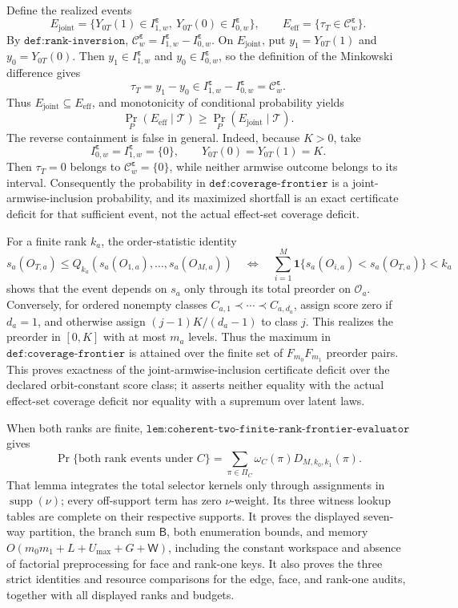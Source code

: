 Define the realized events
\[
E_{\mathrm{joint}}
=
\{Y_{0T}(1)\in I^{\boldsymbol\varepsilon}_{1,w},\
Y_{0T}(0)\in I^{\boldsymbol\varepsilon}_{0,w}\},
\qquad
E_{\mathrm{eff}}
=
\{\tau_T\in\mathcal C^{\boldsymbol\varepsilon}_w\}.
\]
By \(\texttt{def:rank-inversion}\),
\(\mathcal C^{\boldsymbol\varepsilon}_w
=I^{\boldsymbol\varepsilon}_{1,w}
-I^{\boldsymbol\varepsilon}_{0,w}\).
On \(E_{\mathrm{joint}}\), put \(y_1=Y_{0T}(1)\) and \(y_0=Y_{0T}(0)\). Then
\(y_1\in I^{\boldsymbol\varepsilon}_{1,w}\) and
\(y_0\in I^{\boldsymbol\varepsilon}_{0,w}\), so the definition of the Minkowski difference gives
\[
\tau_T=y_1-y_0
\in I^{\boldsymbol\varepsilon}_{1,w}
-I^{\boldsymbol\varepsilon}_{0,w}
=\mathcal C^{\boldsymbol\varepsilon}_w.
\tag{A}
\]
Thus \(E_{\mathrm{joint}}\subseteq E_{\mathrm{eff}}\), and monotonicity of conditional probability yields
\[
\Pr_P(E_{\mathrm{eff}}\mid\mathcal T)
\ge
\Pr_P(E_{\mathrm{joint}}\mid\mathcal T).
\tag{B}
\]
The reverse containment is false in general. Indeed, because \(K>0\), take
\[
I^{\boldsymbol\varepsilon}_{0,w}
=I^{\boldsymbol\varepsilon}_{1,w}=\{0\},
\qquad
Y_{0T}(0)=Y_{0T}(1)=K.
\]
Then \(\tau_T=0\) belongs to
\(\mathcal C^{\boldsymbol\varepsilon}_w=\{0\}\), while neither armwise outcome belongs to its interval. Consequently the probability in \(\texttt{def:coverage-frontier}\) is a joint-armwise-inclusion probability, and its maximized shortfall is an exact certificate deficit for that sufficient event, not the actual effect-set coverage deficit.

For a finite rank \(k_a\), the order-statistic identity
\[
s_a(O_{T,a})\le Q_{k_a}(s_a(O_{1,a}),\ldots,s_a(O_{M,a}))
\quad\Longleftrightarrow\quad
\sum_{i=1}^M\mathbf 1\{s_a(O_{i,a})<s_a(O_{T,a})\}<k_a
\tag{1}
\]
shows that the event depends on \(s_a\) only through its total preorder on \(\mathcal O_a\). Conversely, for ordered nonempty classes \(C_{a,1}\prec\cdots\prec C_{a,d_a}\), assign score zero if \(d_a=1\), and otherwise assign \((j-1)K/(d_a-1)\) to class \(j\). This realizes the preorder in \([0,K]\) with at most \(m_a\) levels. Thus the maximum in \(\texttt{def:coverage-frontier}\) is attained over the finite set of \(F_{m_0}F_{m_1}\) preorder pairs. This proves exactness of the joint-armwise-inclusion certificate deficit over the declared orbit-constant score class; it asserts neither equality with the actual effect-set coverage deficit nor equality with a supremum over latent laws.

When both ranks are finite, \(\texttt{lem:coherent-two-finite-rank-frontier-evaluator}\) gives
\[
\Pr\{\text{both rank events under }C\}
=\sum_{\pi\in\Pi_C}\omega_C(\pi)D_{M,k_0,k_1}(\pi).
\tag{2}
\]
That lemma integrates the total selector kernels only through assignments in \(\operatorname{supp}(\nu)\); every off-support term has zero \(\nu\)-weight. Its three witness lookup tables are complete on their respective supports. It proves the displayed seven-way partition, the branch sum \(\mathsf B\), both enumeration bounds, and memory \(O(m_0m_1+L+U_{\max}+G+\mathsf W)\), including the constant workspace and absence of factorial preprocessing for face and rank-one keys. It also proves the three strict identities and resource comparisons for the edge, face, and rank-one audits, together with all displayed ranks and budgets.


